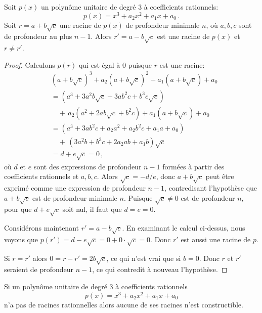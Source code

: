 \begin{theorem}\label{thm.trisect.conjugate}
Soit $p(x)$ un polynôme unitaire de degré 3 à coefficients rationnels:
\[
p(x)=x^3+a_2x^2+a_1x+a_0\,.
\]
Soit $r=a+b\sqrt{c}$ une racine de $p(x)$ de profondeur minimale $n$, où $a,b,c$ sont de profondeur au plus $n-1$. Alors $r'=a-b\sqrt{c}$ est une racine de $p(x)$ et $r\neq r'$.
\end{theorem}



\begin{proof} Calculons $p(r)$ qui est égal à $0$ puisque $r$ est une racine:
\begin{align*}
&(a+b\sqrt{c})^3+a_2(a+b\sqrt{c})^2+a_1(a+b\sqrt{c})+a_0\\
&=(a^3+3a^2b\sqrt{c}+3ab^2c+b^3c\sqrt{c})\\
&\quad+\,a_2(a^2+2ab\sqrt{c}+b^2c) +a_1(a+b\sqrt{c}) +a_0\\
&=(a^3+3ab^2c+a_2a^2+a_2b^2c+a_1a+a_0)\\
&\quad+\,(3a^2b+b^3c+2a_2ab+a_1b)\sqrt{c}\\
&=d+e\sqrt{c}=0\,,
\end{align*}
où $d$ et $e$ sont des expressions de profondeur $n-1$ formées à partir des coefficients rationnels et $a,b,c$. Alors $\sqrt{c}=-d/e$, donc $a+b\sqrt{c}$ peut être exprimé comme une expression de profondeur $n-1$, contredisant l'hypothèse que $a+b\sqrt{c}$ est de profondeur minimale $n$. Puisque $\sqrt{c}\neq 0$  est de profondeur $n$, pour que $d+e\sqrt{c}$ soit nul, il faut que $d=e=0$.

Considérons maintenant $r'=a-b\sqrt{c}$. En examinant le calcul ci-dessus, nous voyons que $p(r')=d-e\sqrt{c}=0+0\cdot\sqrt{c}=0$. Donc $r'$ est aussi une racine de $p$.

Si $r= r'$ alors $0=r-r'=2b\sqrt{c}$, ce qui n'est vrai que si $b=0$. Donc $r$ et $r'$ seraient de profondeur $n-1$, ce qui contredit à nouveau l'hypothèse.
\end{proof}                                

\begin{theorem}
Si un polynôme unitaire de degré 3 à coefficients rationnels 
\[p(x)=x^3+a_2x^2+a_1x+a_0\] n'a pas de racines rationnelles alors aucune de ses racines n'est constructible.
\end{theorem}

